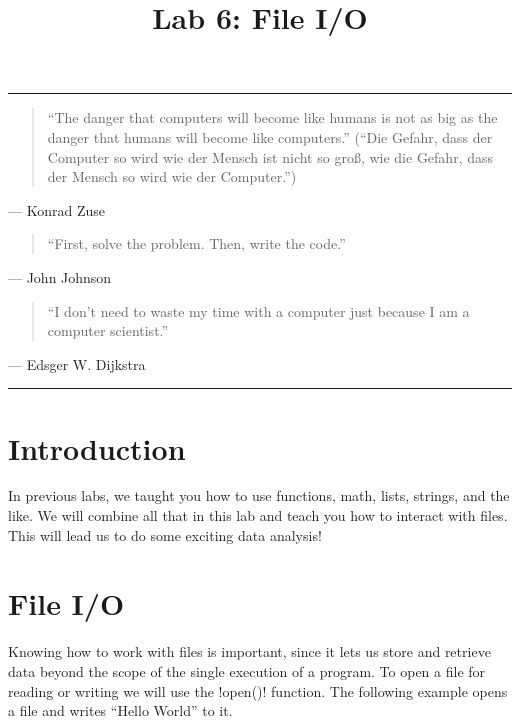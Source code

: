 \documentclass[11pt]{cselabheader}
\title{Lab 6: File I/O}
\begin{document}
\maketitle

\hrule
\begin{quotation}
``The danger that computers will become like humans is not as big as the danger
that humans will become like computers.'' (``Die Gefahr, dass der Computer so
wird wie der Mensch ist nicht so gro\ss, wie die Gefahr, dass der Mensch so wird
wie der Computer.'')
\end{quotation}
\begin{flushright}
--- Konrad Zuse
\end{flushright}

\begin{quotation}
``First, solve the problem. Then, write the code.''
\end{quotation}
\begin{flushright}
--- John Johnson
\end{flushright}

\begin{quotation}
``I don’t need to waste my time with a computer just because I am a computer
scientist.''
\end{quotation}
\begin{flushright}
--- Edsger W. Dijkstra
\end{flushright}

\hrule

\section*{Introduction}

In previous labs, we taught you how to use functions, math, lists, strings, and
the like. We will combine all that in this lab and teach you how to interact
with files. This will lead us to do some exciting data analysis!

\pagebreak

\tableofcontents

\pagebreak
{}
\section{File I/O}
Knowing how to work with files is important, since it lets us store and retrieve
data beyond the scope of the single execution of a program. To open a file for
reading or writing we will use the \pythoninline!open()! function. The following
example opens a file and writes ``Hello World'' to it.
\end{document}

